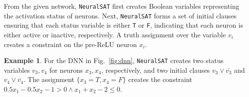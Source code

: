 \documentclass[oneside,11pt,dvipsnames]{book}
\numberwithin{equation}{section}
\theoremstyle{definition}
\newtheorem{example}{Example}[section]
\theoremstyle{remark}
\newcommand{\tool}{\texttt{NeuralSAT}}
\begin{document}
From the given network, \tool{} first creates Boolean variables representing the activation status of neurons. Next, \tool{} forms a set of initial clauses ensuring that each status variable is either \texttt{T} or \texttt{F}, indicating that each neuron is either active or inactive, respectively. A truth assignment over the variable $v_i$ creates a constraint on the pre-ReLU neuron $x_i$.


\begin{example}
For the DNN in Fig.~\ref{fig:dnn}, \tool{} creates two status variables $v_3,v_4$ for neurons $x_3,x_4$, respectively, and two initial clauses $v_3\lor \overline{v_3}$ and $v_4 \lor \overline{v_4}$. The assignment $\{x_3=T, x_4=F \}$ creates the constraint $0.5x_1-0.5x_2-1>0 \land x_1 + x_2 -2 \le 0$.
\end{example}






\end{document}
